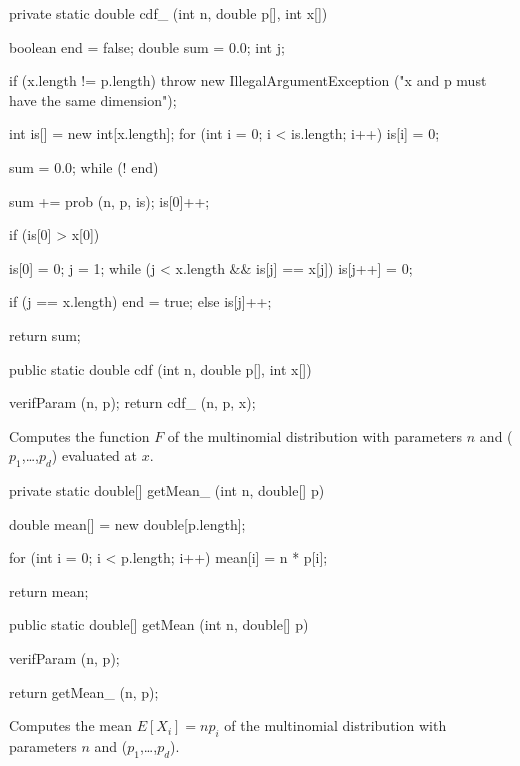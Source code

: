 \begin{code}\begin{hide}

   private static double cdf_ (int n, double p[], int x[]) {
      boolean end = false;
      double sum = 0.0;
      int j;

      if (x.length != p.length)
         throw new IllegalArgumentException ("x and p must have the same dimension");

      int is[] = new int[x.length];
      for (int i = 0; i < is.length; i++)
         is[i] = 0;

      sum = 0.0;
      while (! end)
      {
         sum += prob (n, p, is);
         is[0]++;

         if (is[0] > x[0])
         {
            is[0] = 0;
            j = 1;
            while (j < x.length && is[j] == x[j])
               is[j++] = 0;

            if (j == x.length)
               end = true;
            else
               is[j]++;
         }
      }

      return sum;
   }\end{hide}

   public static double cdf (int n, double p[], int x[])\begin{hide} {
      verifParam (n, p);
      return cdf_ (n, p, x);
   }\end{hide}
\end{code}
\begin{tabb}
   Computes the function $F$ of the multinomial distribution with
   parameters $n$ and ($p_1$,\ldots,$p_d$) evaluated at $x$.
\end{tabb}
\begin{code}\begin{hide}

   private static double[] getMean_ (int n, double[] p) {
      double mean[] = new double[p.length];

      for (int i = 0; i < p.length; i++)
         mean[i] = n * p[i];

      return mean;
   }\end{hide}

   public static double[] getMean (int n, double[] p)\begin{hide} {
      verifParam (n, p);

      return getMean_ (n, p);
   }\end{hide}
\end{code}
\begin{tabb}
   Computes the mean $E[X_i] = np_i$ of the multinomial distribution
   with parameters $n$ and ($p_1$,\ldots,$p_d$).
\end{tabb}
